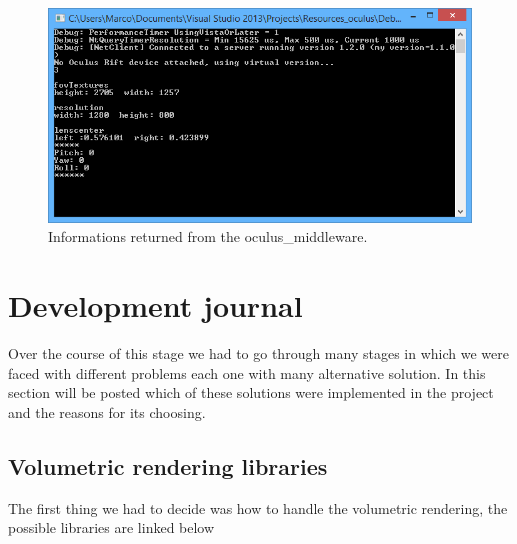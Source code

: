 \documentclass[11pt]{article} %
\begin{document}
\begin{figure}[h!]
	\includegraphics[width=1.0\linewidth]{img/rift_middleware.PNG}
  	\caption{Informations returned from the oculus\_middleware.}
\end{figure}





\newpage

\section{Development journal}
Over the course of this stage we had to go through many stages in which we were faced with different problems each one with many alternative solution. In this section will be posted which of these solutions were implemented in the project and the reasons for its choosing. 

\subsection{Volumetric rendering libraries}
The first thing we had to decide was how to handle the volumetric rendering, the possible libraries are linked below
\end{document}
